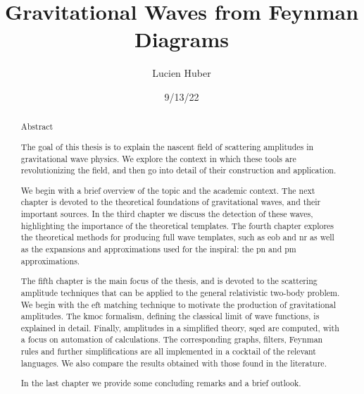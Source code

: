 \documentclass[
  10pt,
  a4paper,
  DIV=11,
  numbers=noendperiod,
  twoside]{scrreprt}
\title{Gravitational Waves from Feynman Diagrams}
\author{Lucien Huber}
\date{9/13/22}
\DeclareRobustCommand{\[}{\begin{equation}}
\DeclareRobustCommand{\]}{\end{equation}}
\begin{document}
\maketitle
\begin{abstract}
\hypertarget{abstract}{%
\chapter*{Abstract}\label{abstract}}


The goal of this thesis is to explain the nascent field of scattering
amplitudes in gravitational wave physics. We explore the context in
which these tools are revolutionizing the field, and then go into detail
of their construction and application.

We begin with a brief overview of the topic and the academic context.
The next chapter is devoted to the theoretical foundations of
gravitational waves, and their important sources. In the third chapter
we discuss the detection of these waves, highlighting the importance of
the theoretical templates. The fourth chapter explores the theoretical
methods for producing full wave templates, such as \gls{eob} and
\gls{nr} as well as the expansions and approximations used for the
inspiral: the \gls{pn} and \gls{pm} approximations.

The fifth chapter is the main focus of the thesis, and is devoted to the
scattering amplitude techniques that can be applied to the general
relativistic two-body problem. We begin with the \gls{eft} matching
technique to motivate the production of gravitational amplitudes. The
\gls{kmoc} formalism, defining the classical limit of wave functions, is
explained in detail. Finally, amplitudes in a simplified theory,
\gls{sqed} are computed, with a focus on automation of calculations. The
corresponding graphs, filters, Feynman rules and further simplifications
are all implemented in a cocktail of the relevant languages. We also
compare the results obtained with those found in the literature.

In the last chapter we provide some concluding remarks and a brief
outlook.
\end{abstract}
\usetikzlibrary{decorations.markings,graphs,decorations.pathmorphing,graphdrawing,quotes,arrows.meta}



\newcommand{\half}[1][1]{\tfrac{#1}{2}}
\newcommand{\Half}[1][1]{\frac{#1}{2}}
\newcommand{\pa}[2][]{#1(#2 #1)}
\newcommand{\bc}[2][]{#1[#2 #1]}
\newcommand{\brc}{\bc}
\newcommand{\bk}[2][]{#1\{#2 #1\}}
\newcommand{\brk}{\bk}
\newcommand{\ang}[2][]{#1\langle #2 #1\rangle}
\newcommand{\abs}[2][]{#1\vert#2 #1\vert}
\newcommand{\norm}[2][]{#1\Vert#2 #1\Vert}
\newcommand{\order}[2][]{\mathcal{O}(#2^{#1})}
\end{document}

